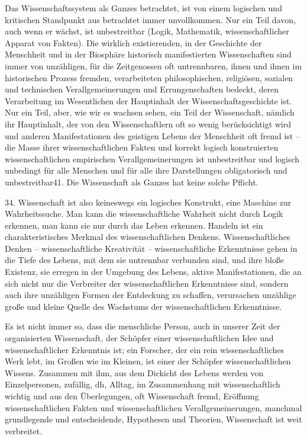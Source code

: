 \documentclass[11pt,a4paper]{book}
\begin{document}
Das Wissenschaftssystem als Ganzes betrachtet, ist von einem logischen und kritischen Standpunkt aus betrachtet immer unvollkommen. Nur ein Teil davon, auch wenn er wächst, ist unbestreitbar (Logik, Mathematik, wissenschaftlicher Apparat von Fakten). Die wirklich existierenden, in der Geschichte der Menschheit und in der Biosphäre historisch manifestierten Wissenschaften sind immer von unzähligen, für die Zeitgenossen oft untrennbaren, ihnen und ihnen im historischen Prozess fremden, verarbeiteten philosophischen, religiösen, sozialen und technischen Verallgemeinerungen und Errungenschaften bedeckt, deren Verarbeitung im Wesentlichen der Hauptinhalt der Wissenschaftsgeschichte ist. Nur ein Teil, aber, wie wir es wachsen sehen, ein Teil der Wissenschaft, nämlich ihr Hauptinhalt, der von den Wissenschaftlern oft so wenig berücksichtigt wird und anderen Manifestationen des geistigen Lebens der Menschheit oft fremd ist -- die Masse ihrer wissenschaftlichen Fakten und korrekt logisch konstruierten wissenschaftlichen empirischen Verallgemeinerungen ist unbestreitbar und logisch unbedingt für alle Menschen und für alle ihre Darstellungen obligatorisch und unbestreitbar41. Die Wissenschaft als Ganzes hat keine solche Pflicht. 

34. Wissenschaft ist also keineswegs ein logisches Konstrukt, eine Maschine zur Wahrheitssuche. Man kann die wissenschaftliche Wahrheit nicht durch Logik erkennen, man kann sie nur durch das Leben erkennen. Handeln ist ein charakteristisches Merkmal des wissenschaftlichen Denkens. Wissenschaftliches Denken -- wissenschaftliche Kreativität -- wissenschaftliche Erkenntnisse gehen in die Tiefe des Lebens, mit dem sie untrennbar verbunden sind, und ihre bloße Existenz, sie erregen in der Umgebung des Lebens, aktive Manifestationen, die an sich nicht nur die Verbreiter der wissenschaftlichen Erkenntnisse sind, sondern auch ihre unzähligen Formen der Entdeckung zu schaffen, verursachen unzählige große und kleine Quelle des Wachstums der wissenschaftlichen Erkenntnisse. 

Es ist nicht immer so, dass die menschliche Person, auch in unserer Zeit der organisierten Wissenschaft, der Schöpfer einer wissenschaftlichen Idee und wissenschaftlicher Erkenntnis ist; ein Forscher, der ein rein wissenschaftliches Werk lebt, im Großen wie im Kleinen, ist einer der Schöpfer wissenschaftlichen Wissens. Zusammen mit ihm, aus dem Dickicht des Lebens werden von Einzelpersonen, zufällig, dh, Alltag, im Zusammenhang mit wissenschaftlich wichtig und aus den Überlegungen, oft Wissenschaft fremd, Eröffnung wissenschaftlichen Fakten und wissenschaftlichen Verallgemeinerungen, manchmal grundlegende und entscheidende, Hypothesen und Theorien, Wissenschaft ist weit verbreitet. 
\end{document}
